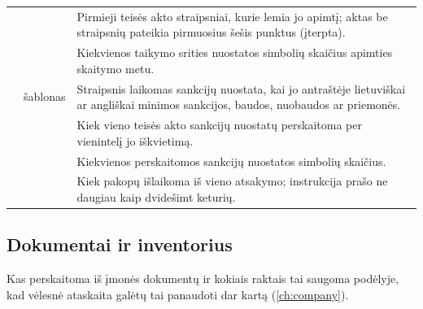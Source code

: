 \begin{xltabular}{\textwidth}{@{}L{44mm}L{19mm}Y@{}}
 &  & Pirmieji teisės akto straipsniai, kurie lemia jo apimtį; aktas be straipsnių pateikia pirmuosius šešis punktus (įterpta). \\
 &  & Kiekvienos taikymo srities nuostatos simbolių skaičius apimties skaitymo metu. \\
 & šablonas & Straipsnis laikomas sankcijų nuostata, kai jo antraštėje lietuviškai ar angliškai minimos sankcijos, baudos, nuobaudos ar priemonės. \\
 &  & Kiek vieno teisės akto sankcijų nuostatų perskaitoma per vienintelį jo iškvietimą. \\
 &  & Kiekvienos perskaitomos sankcijų nuostatos simbolių skaičius. \\
 &  & Kiek pakopų išlaikoma iš vieno atsakymo; instrukcija prašo ne daugiau kaip dvidešimt keturių. \\
\end{xltabular}


\subsection{Dokumentai ir inventorius}\label{sec:config:documents}

Kas perskaitoma iš įmonės dokumentų ir kokiais raktais tai saugoma podėlyje, kad vėlesnė
ataskaita galėtų tai panaudoti dar kartą (\cref{ch:company}).

